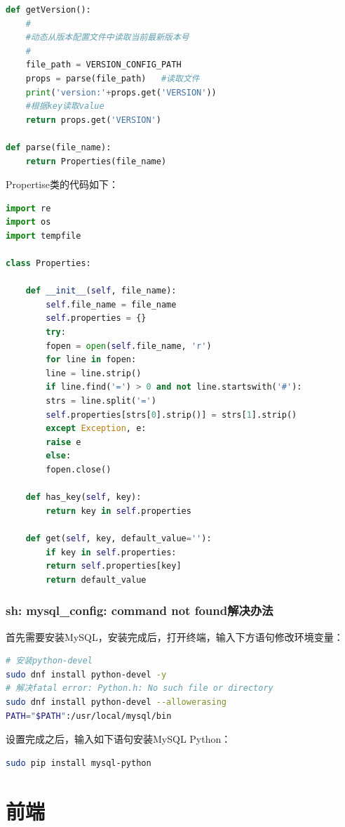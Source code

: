\documentclass[letter]{book}
\begin{document}
\begin{lstlisting}[language=Python]
def getVersion():
	#
	#动态从版本配置文件中读取当前最新版本号
	#
	file_path = VERSION_CONFIG_PATH
	props = parse(file_path)   #读取文件
	print('version:'+props.get('VERSION'))
	#根据key读取value
	return props.get('VERSION')            

def parse(file_name):
	return Properties(file_name)
\end{lstlisting}

Propertise类的代码如下：

\begin{lstlisting}[language=Python]
import re
import os
import tempfile

class Properties:

	def __init__(self, file_name):
		self.file_name = file_name
		self.properties = {}
		try:
		fopen = open(self.file_name, 'r')
		for line in fopen:
		line = line.strip()
		if line.find('=') > 0 and not line.startswith('#'):
		strs = line.split('=')
		self.properties[strs[0].strip()] = strs[1].strip()
		except Exception, e:
		raise e
		else:
		fopen.close()
	
	def has_key(self, key):
		return key in self.properties
	
	def get(self, key, default_value=''):
		if key in self.properties:
		return self.properties[key]
		return default_value
\end{lstlisting}


\subsection{sh: mysql\_config: command not found解决办法}

首先需要安装MySQL，安装完成后，打开终端，输入下方语句修改环境变量：

\begin{lstlisting}[language=Bash]
# 安装python-devel
sudo dnf install python-devel -y
# 解决fatal error: Python.h: No such file or directory
sudo dnf install python-devel --allowerasing
PATH="$PATH":/usr/local/mysql/bin
\end{lstlisting}

设置完成之后，输入如下语句安装MySQL Python：

\begin{lstlisting}[language=Bash]
sudo pip install mysql-python
\end{lstlisting}

\chapter{前端}
\end{document}

